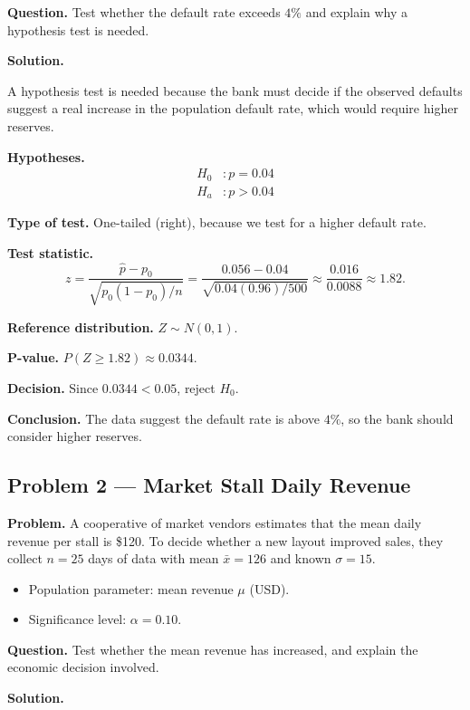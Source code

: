 	\textbf{Question.} Test whether the default rate exceeds $4\%$ and explain why a hypothesis test is needed.
	
	\textbf{Solution.}
	
	A hypothesis test is needed because the bank must decide if the observed defaults suggest a real increase in the population default rate, which would require higher reserves.
	
	\textbf{Hypotheses.}
	\[
	\begin{aligned}
		H_0&: p = 0.04 \\
		H_a&: p > 0.04
	\end{aligned}
	\]
	
	\textbf{Type of test.} One-tailed (right), because we test for a higher default rate.
	
	\textbf{Test statistic.}
	\[
	z = \frac{\hat{p}-p_0}{\sqrt{p_0(1-p_0)/n}} = \frac{0.056-0.04}{\sqrt{0.04(0.96)/500}} \approx \frac{0.016}{0.0088} \approx 1.82.
	\]
	
	\textbf{Reference distribution.} $Z \sim N(0,1)$.
	
	\textbf{P-value.} $P(Z\ge 1.82)\approx 0.0344$.
	
	\textbf{Decision.} Since $0.0344<0.05$, reject $H_0$.
	
	\textbf{Conclusion.} The data suggest the default rate is above $4\%$, so the bank should consider higher reserves.
	
	\hypertarget{c9-ex2}{}
	\subsection*{Problem 2 — Market Stall Daily Revenue}
	
	\textbf{Problem.} A cooperative of market vendors estimates that the mean daily revenue per stall is \$120. To decide whether a new layout improved sales, they collect $n=25$ days of data with mean $\bar{x}=126$ and known $\sigma=15$.
	\begin{itemize}
		\item Population parameter: mean revenue $\mu$ (USD).
		\item Significance level: $\alpha=0.10$.
	\end{itemize}
	
	\textbf{Question.} Test whether the mean revenue has increased, and explain the economic decision involved.
	
	\textbf{Solution.}
	

